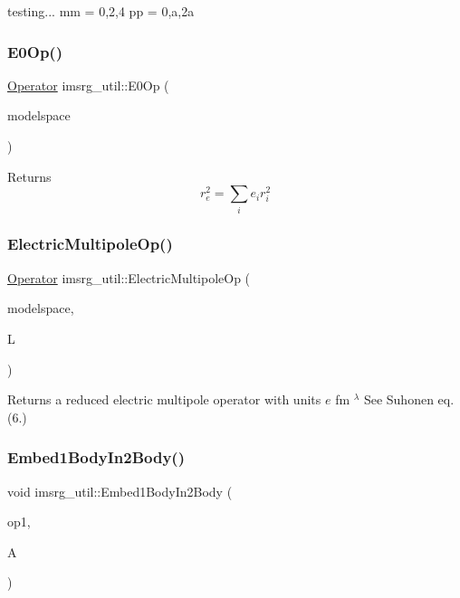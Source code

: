 testing... mm = 0,2,4 pp = 0,a,2a \mbox{\label{namespaceimsrg__util_ad1e33474a16032712deea7f482ac4013}} 
\subsubsection{\texorpdfstring{E0\+Op()}{E0Op()}}
{\footnotesize\ttfamily \hyperlink{classOperator}{Operator} imsrg\+\_\+util\+::\+E0\+Op (\begin{DoxyParamCaption}\item[{\hyperlink{classModelSpace}{Model\+Space} \&}]{modelspace }\end{DoxyParamCaption})}

Returns \[ r_{e}^2 = \sum_{i} e_{i} r_{i}^2 \] \mbox{\label{namespaceimsrg__util_ac9117a9e43ab4994cd28e9eebeb845ac}} 
\subsubsection{\texorpdfstring{Electric\+Multipole\+Op()}{ElectricMultipoleOp()}}
{\footnotesize\ttfamily \hyperlink{classOperator}{Operator} imsrg\+\_\+util\+::\+Electric\+Multipole\+Op (\begin{DoxyParamCaption}\item[{\hyperlink{classModelSpace}{Model\+Space} \&}]{modelspace,  }\item[{int}]{L }\end{DoxyParamCaption})}

Returns a reduced electric multipole operator with units $ e$ fm $^{\lambda} $ See Suhonen eq. (6.) \mbox{\label{namespaceimsrg__util_a4401971760847346e50bbfef08939f1e}} 
\subsubsection{\texorpdfstring{Embed1\+Body\+In2\+Body()}{Embed1BodyIn2Body()}}
{\footnotesize\ttfamily void imsrg\+\_\+util\+::\+Embed1\+Body\+In2\+Body (\begin{DoxyParamCaption}\item[{\hyperlink{classOperator}{Operator} \&}]{op1,  }\item[{int}]{A }\end{DoxyParamCaption})}

